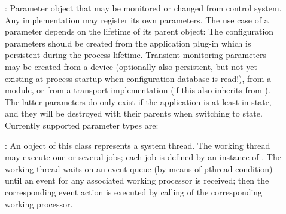\begin{description}
\item[] :   
Parameter object that may be monitored or 
   changed from control system. Any  implementation 
   may register its own parameters. The use case of a parameter 
   depends on the lifetime of its parent object: The configuration 
   parameters should be created from the application plug-in which 
   is persistent during the process lifetime. Transient monitoring parameters 
   may be created from a device (optionally also persistent, but not 
   yet existing at process startup when configuration database is read!), 
   from a module, or from a transport implementation (if this 
   also inherits from ). The latter parameters 
   do only exist if the application is at least in  state, and 
   they will be destroyed with their parents when switching to  state. 
   Currently supported parameter types are:

\item[] :  
An object of this class represents a system thread. 
   The working thread may execute one or several jobs; each job is defined 
   by an instance of . The working thread waits on an 
   event queue (by means of pthread condition) until an event for any 
   associated working processor is received; then the corresponding event action is 
   executed by calling  of the corresponding working processor.


\end{description}
